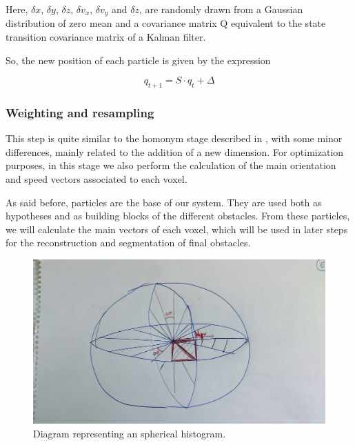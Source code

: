 Here, $\delta x$, $\delta y$, $\delta z$, $\delta v_x$, $\delta v_y$ and $\delta z$, are randomly drawn from a Gaussian distribution of zero mean and a covariance matrix Q equivalent to the state transition covariance matrix of a Kalman filter.

So, the new position of each particle is given by the expression

\begin{equation}\label{eq:cp05_particle_update}
q_{t + 1} = S \cdot q_{t} + \Delta
\end{equation}

\FloatBarrier

\subsubsection{Weighting and resampling}\label{ch:chapter05_01_04_02}

This step is quite similar to the homonym stage described in \cite{danescu2012particle}, with some minor differences, mainly related to the addition of a new dimension. For optimization purposes, in this stage we also perform the calculation of the main orientation and speed vectors associated to each voxel.

As said before, particles are the base of our system. They are used both as hypotheses and as building blocks of the different obstacles. From these particles, we will calculate the main vectors of each voxel, which will be used in later steps for the reconstruction and segmentation of final obstacles.

\begin{figure}[h!]
  \centering
  \includegraphics{sphericalHist}
  \caption{Diagram representing an spherical histogram.}\label{fig:cp05_spherical_hist}
\end{figure}

